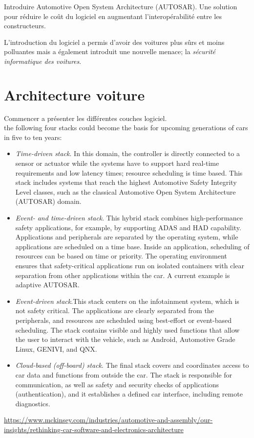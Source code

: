 \begin{tbd}
Introduire Automotive Open System Architecture (AUTOSAR). Une solution pour r\'eduire le co\^ut du logiciel en augmentant l'interop\'erabilit\'e entre les constructeurs.
\end{tbd}


L'introduction du logiciel a permis d'avoir des voitures plus s\^urs et moins polluantes mais a \'egalement introduit une nouvelle menace; la \emph{s\'ecurit\'e informatique des voitures}. 

\section {Architecture voiture}

\begin{tbd}
Commencer a pr\'esenter les diff\'erentes couches logiciel.\\

the following four stacks could become the basis for upcoming generations of cars in five to ten years:
\begin{itemize}

\item \emph{Time-driven stack}. In this domain, the controller is directly connected to a sensor or actuator while the systems have to support hard real-time requirements and low latency times; resource scheduling is time based. This stack includes systems that reach the highest Automotive Safety Integrity Level classes, such as the classical Automotive Open System Architecture (AUTOSAR) domain.
\item \emph{Event- and time-driven stack}. This hybrid stack combines high-performance safety applications, for example, by supporting ADAS and HAD capability. Applications and peripherals are separated by the operating system, while applications are scheduled on a time base. Inside an application, scheduling of resources can be based on time or priority. The operating environment ensures that safety-critical applications run on isolated containers with clear separation from other applications within the car. A current example is adaptive AUTOSAR.
\item \emph{Event-driven stack}.This stack centers on the infotainment system, which is not safety critical. The applications are clearly separated from the peripherals, and resources are scheduled using best-effort or event-based scheduling. The stack contains visible and highly used functions that allow the user to interact with the vehicle, such as Android, Automotive Grade Linux, GENIVI, and QNX.
\item \emph{Cloud-based (off-board) stack}. The final stack covers and coordinates access to car data and functions from outside the car. The stack is responsible for communication, as well as safety and security checks of applications (authentication), and it establishes a defined car interface, including remote diagnostics.
\end{itemize}

\url{https://www.mckinsey.com/industries/automotive-and-assembly/our-insights/rethinking-car-software-and-electronics-architecture}
\end{tbd}



